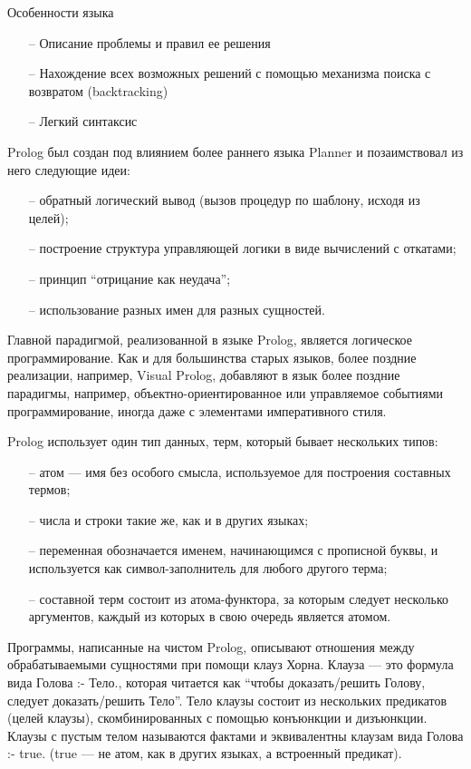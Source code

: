 Особенности языка

\begin{itemize}
    \item[--] Описание проблемы и правил ее решения
    \item[--] Нахождение всех возможных решений с помощью механизма поиска с возвратом (backtracking)
    \item[--] Легкий синтаксис
\end{itemize}
	
		Prolog был создан под влиянием более раннего языка Planner и позаимствовал из него следующие идеи:

		\begin{itemize}
			\item[--] обратный логический вывод (вызов процедур по шаблону, исходя из целей);
			\item[--] построение структура управляющей логики в виде вычислений с откатами;
			\item[--] принцип “отрицание как неудача”;
			\item[--] использование разных имен для разных сущностей.
		\end{itemize}

		Главной парадигмой, реализованной в языке Prolog, является логическое программирование.
			Как и для большинства старых языков, более поздние реализации, например, Visual Prolog,
			добавляют в язык более поздние парадигмы, например, объектно-ориентированное или управляемое
			событиями программирование, иногда даже с элементами императивного стиля.

		Prolog использует один тип данных, терм, который бывает нескольких типов:

		\begin{itemize}
			\item[--] атом — имя без особого смысла, используемое для построения составных термов;
			\item[--] числа и строки такие же, как и в других языках;
			\item[--] переменная обозначается именем, начинающимся с прописной буквы,
				и используется как символ-заполнитель для любого другого терма;
			\item[--] составной терм состоит из атома-функтора, за которым следует несколько аргументов,
				каждый из которых в свою очередь является атомом.
		\end{itemize}

		Программы, написанные на чистом Prolog, описывают отношения между обрабатываемыми сущностями при помощи клауз Хорна. Клауза — это формула вида Голова :- Тело., которая читается как “чтобы доказать/решить Голову, следует доказать/решить Тело”. Тело клаузы состоит из нескольких предикатов (целей клаузы), скомбинированных с помощью конъюнкции и дизъюнкции. Клаузы с пустым телом называются фактами и эквивалентны клаузам вида Голова :- true. (true — не атом, как в других языках, а встроенный предикат).

